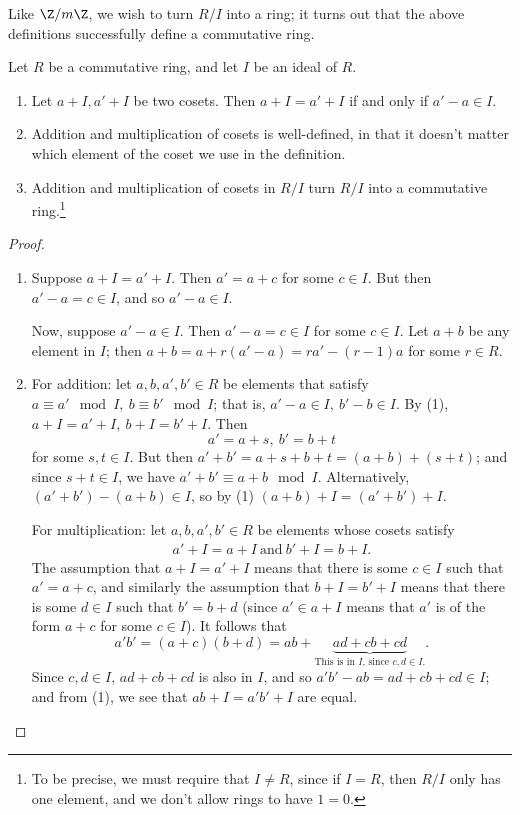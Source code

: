 \documentclass[math1530-lecture-notes]{subfiles}
\begin{document}
Like $\Z / m\Z$, we wish to turn $R / I$ into a ring; it turns out that the above definitions
successfully define a commutative ring.

\begin{proposition}[]{}
  Let $R$ be a commutative ring, and let $I$ be an ideal of $R$.
  \begin{enumerate}
    \item Let $a+I,a'+I$ be two cosets. Then $a+I=a'+I$ if and only if $a'-a\in I$.
    \item Addition and multiplication of cosets is well-defined, in that it doesn't matter which
      element of the coset we use in the definition.
    \item Addition and multiplication of cosets in $R / I$ turn $R / I$ into a commutative
      ring.\footnote{To be precise, we must require that $I\neq R$, since if $I=R$, then $R/I$ only
      has one element, and we don't allow rings to have $1=0$.}
  \end{enumerate}
\end{proposition}
\begin{proof}[Proof]
  \begin{enumerate}
    \item Suppose $a+I=a'+I$. Then $a'=a+c$ for some $c\in I$. But then $a'-a=c\in I$, and so
      $a'-a\in I$.

      Now, suppose $a'-a\in I$. Then $a'-a=c\in I$ for some $c\in I$. Let $a+b$ be any element in
      $I$; then $a+b=a+r(a'-a)=ra'-(r-1)a$ for some $r\in R$.
    \item For addition: let $a,b,a',b'\in R$ be elements that satisfy $a\equiv a'\mod{I},\ b\equiv
      b'\mod{I}$; that is, $a'-a\in I,\ b'-b\in I$. By (1), $a+I=a'+I,\ b+I=b'+I$. Then \[
        a'=a+s,\ b'=b+t
      \] for some $s,t\in I$. But then $a'+b'=a+s+b+t=(a+b)+(s+t)$; and since $s+t\in I$, we have
      $a'+b'\equiv a+b\mod{I}$. Alternatively, $(a'+b')-(a+b)\in I$, so by (1) $(a+b)+I=(a'+b')+I$.

      For multiplication: let $a,b,a',b'\in R$ be elements whose cosets satisfy
      \begin{align*}
        a'+I=a+I ~\text{and}~b'+I=b+I
      .\end{align*} The assumption that $a+I=a'+I$ means that there is some $c\in I$ such that $a'=a+c$,
      and similarly the assumption that $b+I=b'+I$ means that there is some $d\in I$ such that $b'=b+d$
      (since $a'\in a+I$ means that $a'$ is of the form $a+c$ for some $c\in I$). It follows that \[
        a'b'=(a+c)(b+d)=ab+\underbrace{ad+cb+cd}_\text{This is in $I$, since $c,d\in I$.}
      .\] Since $c,d\in I$, $ad+cb+cd$ is also in $I$, and so $a'b'-ab=ad+cb+cd \in I$; and from (1), we
      see that $ab+I=a'b'+I$ are equal.
  \end{enumerate}
\end{proof}
\end{document}
